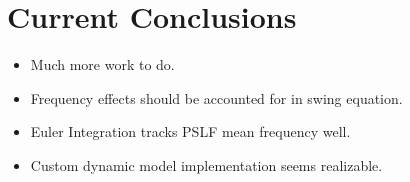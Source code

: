 \documentclass[14pt, unknownkeysallowed]{beamer}
\begin{document}
\section{Current Conclusions}
\begin{frame}
\begin{itemize}
	\item Much more work to do.
	\item Frequency effects should be accounted for in swing equation.
	\item Euler Integration tracks PSLF mean frequency well.
	\item Custom dynamic model implementation seems realizable. 
\end{itemize}
\end{frame}

\end{document}
